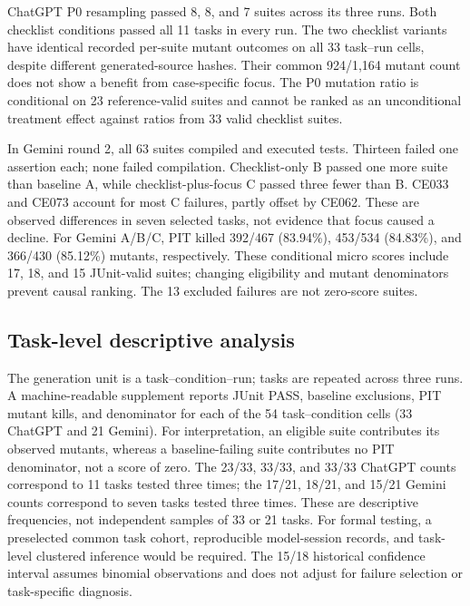 \documentclass[conference]{IEEEtran}
\begin{document}
ChatGPT P0 resampling passed 8, 8, and 7 suites across its three runs. Both checklist conditions passed all 11 tasks in every run. The two checklist variants have identical recorded per-suite mutant outcomes on all 33 task--run cells, despite different generated-source hashes. Their common 924/1,164 mutant count does not show a benefit from case-specific focus. The P0 mutation ratio is conditional on 23 reference-valid suites and cannot be ranked as an unconditional treatment effect against ratios from 33 valid checklist suites.

In Gemini round 2, all 63 suites compiled and executed tests. Thirteen failed one assertion each; none failed compilation. Checklist-only B passed one more suite than baseline A, while checklist-plus-focus C passed three fewer than B. CE033 and CE073 account for most C failures, partly offset by CE062. These are observed differences in seven selected tasks, not evidence that focus caused a decline. For Gemini A/B/C, PIT killed 392/467 (83.94\%), 453/534 (84.83\%), and 366/430 (85.12\%) mutants, respectively. These conditional micro scores include 17, 18, and 15 JUnit-valid suites; changing eligibility and mutant denominators prevent causal ranking. The 13 excluded failures are not zero-score suites.
\subsection{Task-level descriptive analysis}
The generation unit is a task--condition--run; tasks are repeated across three runs. A machine-readable supplement reports JUnit PASS, baseline exclusions, PIT mutant kills, and denominator for each of the 54 task--condition cells (33 ChatGPT and 21 Gemini). For interpretation, an eligible suite contributes its observed mutants, whereas a baseline-failing suite contributes no PIT denominator, not a score of zero. The 23/33, 33/33, and 33/33 ChatGPT counts correspond to 11 tasks tested three times; the 17/21, 18/21, and 15/21 Gemini counts correspond to seven tasks tested three times. These are descriptive frequencies, not independent samples of 33 or 21 tasks. For formal testing, a preselected common task cohort, reproducible model-session records, and task-level clustered inference would be required. The 15/18 historical confidence interval assumes binomial observations and does not adjust for failure selection or task-specific diagnosis.
\end{document}
